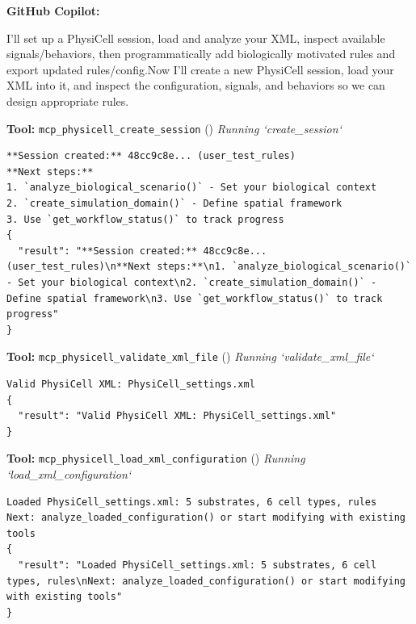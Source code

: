 \documentclass[11pt,a4paper]{article}
\begin{document}
\begin{copilotbox}
\textbf{GitHub Copilot:}

I'll set up a PhysiCell session, load and analyze your XML, inspect available signals/behaviors, then programmatically add biologically motivated rules and export updated rules/config.Now I'll create a new PhysiCell session, load your XML into it, and inspect the configuration, signals, and behaviors so we can design appropriate rules.

\end{copilotbox}
\begin{toolokbox}
\textbf{Tool:} \texttt{mcp\_physicell\_create\_session} (\checkmark)
\textit{Running `create\_session`}
\begin{lstlisting}
**Session created:** 48cc9c8e... (user_test_rules)
**Next steps:**
1. `analyze_biological_scenario()` - Set your biological context
2. `create_simulation_domain()` - Define spatial framework
3. Use `get_workflow_status()` to track progress
{
  "result": "**Session created:** 48cc9c8e... (user_test_rules)\n**Next steps:**\n1. `analyze_biological_scenario()` - Set your biological context\n2. `create_simulation_domain()` - Define spatial framework\n3. Use `get_workflow_status()` to track progress"
}
\end{lstlisting}
\end{toolokbox}
\begin{toolokbox}
\textbf{Tool:} \texttt{mcp\_physicell\_validate\_xml\_file} (\checkmark)
\textit{Running `validate\_xml\_file`}
\begin{lstlisting}
Valid PhysiCell XML: PhysiCell_settings.xml
{
  "result": "Valid PhysiCell XML: PhysiCell_settings.xml"
}
\end{lstlisting}
\end{toolokbox}
\begin{toolokbox}
\textbf{Tool:} \texttt{mcp\_physicell\_load\_xml\_configuration} (\checkmark)
\textit{Running `load\_xml\_configuration`}
\begin{lstlisting}
Loaded PhysiCell_settings.xml: 5 substrates, 6 cell types, rules
Next: analyze_loaded_configuration() or start modifying with existing tools
{
  "result": "Loaded PhysiCell_settings.xml: 5 substrates, 6 cell types, rules\nNext: analyze_loaded_configuration() or start modifying with existing tools"
}
\end{lstlisting}
\end{toolokbox}
\end{document}
